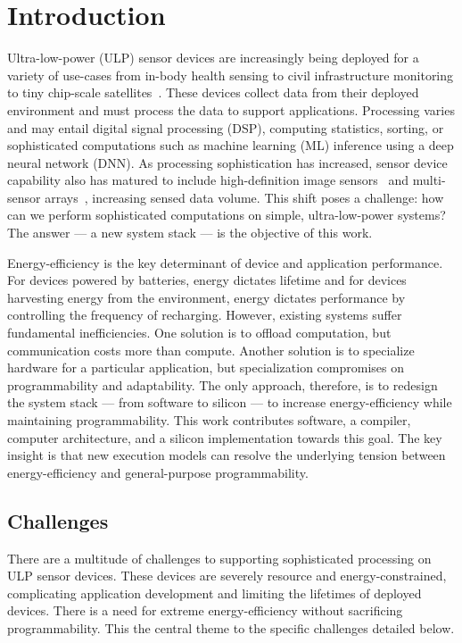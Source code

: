 \chapter{Introduction}
\label{chapter:intro}
Ultra-low-power (ULP) sensor devices are increasingly being deployed for a variety of use-cases from in-body health sensing to civil infrastructure monitoring to tiny chip-scale satellites~\cite{kicksat}.
% 
These devices collect data from their deployed environment and must process the 
data to support applications.
% 
Processing varies and may entail digital signal
processing (DSP), computing statistics, sorting, or sophisticated computations
such as machine learning (ML) inference using a deep neural network (DNN).
% 
As processing sophistication has increased, sensor device capability also
has matured to include high-definition image sensors~\cite{naderiparizi2018towards} and multi-sensor arrays~\cite{laput2017synthetic}, increasing sensed data volume.
%
This shift poses a challenge: how can we perform sophisticated computations
on simple, ultra-low-power systems?
% 
The answer --- a new system stack --- is the objective of this work.

Energy-efficiency is the key determinant of device and application performance.
% 
For devices powered by batteries, energy dictates lifetime and for devices harvesting energy from the environment, energy dictates performance by controlling the frequency of recharging.
% 
However, existing systems suffer fundamental inefficiencies.
% 
One solution is to offload computation, but communication costs more than compute.
% 
Another solution is to specialize hardware for a particular application, but specialization compromises on programmability and adaptability.
% 
The only approach, therefore, is to redesign the system stack --- from software to silicon --- to increase energy-efficiency while maintaining programmability.
% 
This work  contributes software, a compiler, computer architecture, and a silicon implementation towards this goal.
% 
The key insight is that new execution models can resolve the underlying tension between energy-efficiency and general-purpose programmability.

\section{Challenges}
There are a multitude of challenges to supporting sophisticated processing on ULP sensor devices.
% 
These devices are severely resource and energy-constrained, complicating application development and limiting the lifetimes of deployed devices.
% 
There is a need for extreme energy-efficiency without sacrificing programmability.
% 
This the central theme to the specific challenges detailed below.

